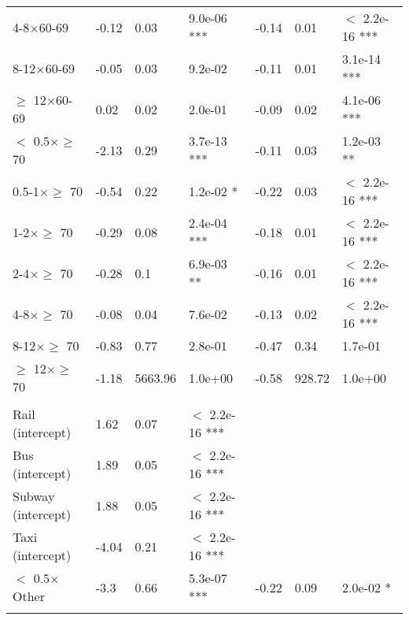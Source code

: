 \documentclass{article}\usepackage[utf8]{inputenc}
\begin{document}
\begin{longtable}[t]{lllllll}
\hspace{1em}4-8$\times$60-69 & -0.12 & 0.03 & 9.0e-06 *** & -0.14 & 0.01 & $<$ 2.2e-16 ***\\
\hspace{1em}8-12$\times$60-69 & -0.05 & 0.03 & 9.2e-02 & -0.11 & 0.01 & 3.1e-14 ***\\
\hspace{1em}$\geq$ 12$\times$60-69 & 0.02 & 0.02 & 2.0e-01 & -0.09 & 0.02 & 4.1e-06 ***\\
\hspace{1em}$<$ 0.5$\times$$\geq$ 70 & -2.13 & 0.29 & 3.7e-13 *** & -0.11 & 0.03 & 1.2e-03 **\\
\hspace{1em}0.5-1$\times$$\geq$ 70 & -0.54 & 0.22 & 1.2e-02 * & -0.22 & 0.03 & $<$ 2.2e-16 ***\\
\hspace{1em}1-2$\times$$\geq$ 70 & -0.29 & 0.08 & 2.4e-04 *** & -0.18 & 0.01 & $<$ 2.2e-16 ***\\
\hspace{1em}2-4$\times$$\geq$ 70 & -0.28 & 0.1 & 6.9e-03 ** & -0.16 & 0.01 & $<$ 2.2e-16 ***\\
\hspace{1em}4-8$\times$$\geq$ 70 & -0.08 & 0.04 & 7.6e-02 & -0.13 & 0.02 & $<$ 2.2e-16 ***\\
\hspace{1em}8-12$\times$$\geq$ 70 & -0.83 & 0.77 & 2.8e-01 & -0.47 & 0.34 & 1.7e-01\\
\hspace{1em}$\geq$ 12$\times$$\geq$ 70 & -1.18 & 5663.96 & 1.0e+00 & -0.58 & 928.72 & 1.0e+00\\
\addlinespace[0.3em]
\multicolumn{7}{l}{\textbf{Distance$\times$Trip purpose, McFadden $R^2 = 0.58$}}\\
\hline
\hspace{1em}Rail (intercept) & 1.62 & 0.07 & $<$ 2.2e-16 *** &  &  & \\
\hspace{1em}Bus (intercept) & 1.89 & 0.05 & $<$ 2.2e-16 *** &  &  & \\
\hspace{1em}Subway (intercept) & 1.88 & 0.05 & $<$ 2.2e-16 *** &  &  \vphantom{1}& \\
\hspace{1em}Taxi (intercept) & -4.04 & 0.21 & $<$ 2.2e-16 *** &  &  & \\
\hspace{1em}$<$ 0.5$\times$Other & -3.3 & 0.66 & 5.3e-07 *** & -0.22 & 0.09 & 2.0e-02 *\\
$$
\end{longtable}
\end{document}
